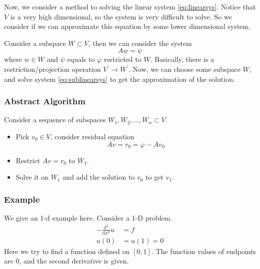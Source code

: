 Now, we consider a method to solving the linear system \eqref{eq:linearsys}. Notice that $V$ is a very high dimensional, so the system is very difficult to solve. So we consider if we can approximate this equation by some lower dimensional system.

Consider a subspace $W\subset V$, then we can consider the system 
\begin{equation}\label{eq:sublinearsys}
Aw = \psi
\end{equation}
where $w\in W$ and $\psi$ equals to $\varphi$ restricted to $W$. Basically, there is a restriction/projection operation $V^\prime \to W^\prime$.%
Now, we can choose some subspace $W$, and solve system \eqref{eq:sublinearsys} to get the approximation of the solution.

\subsubsection{Abstract Algorithm}
Consider a sequence of subspaces $W_1, W_2, \ldots, W_n \subset V$. 
\begin{itemize}
\item Pick $v_0\in V$, consider residual equation 
\begin{equation}
Av = r_0 = \varphi - A v_0
\end{equation}
\item Restrict $Av=r_0 $ to $W_1$. 
\item Solve it on $W_1$ and add the solution to $v_0$ to get $v_1$.
\end{itemize}

\subsubsection{Example}
We give an 1-d example here. Consider a 1-D problem.
\begin{equation}
\begin{split}
 -\frac{\textrm{d}^2}{\textrm{d} x^2} u &= f  \label{eq:1dProb}\\
 u(0)&=u(1)=0
\end{split}
\end{equation}
Here we try to find a function defined on $[0,1]$. The function values of endpoints are $0$, and the second derivative is given. 

